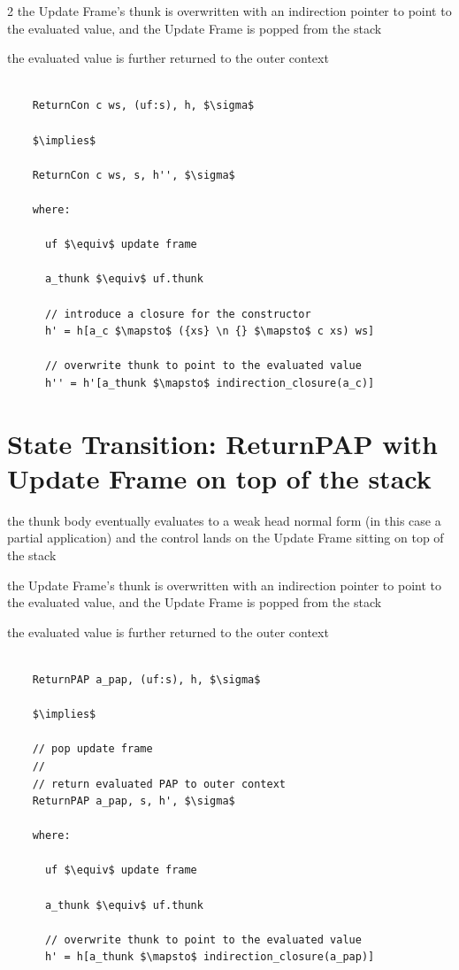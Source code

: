 \documentclass[8pt]{extarticle}
\begin{document}
\begin{multicols*}{2}
  the Update Frame's thunk is overwritten with an indirection pointer to point to the evaluated value, and the Update Frame is popped from the stack

  the evaluated value is further returned to the outer context

  \begin{lstlisting}

    ReturnCon c ws, (uf:s), h, $\sigma$

    $\implies$

    ReturnCon c ws, s, h'', $\sigma$

    where:

      uf $\equiv$ update frame

      a_thunk $\equiv$ uf.thunk

      // introduce a closure for the constructor
      h' = h[a_c $\mapsto$ ({xs} \n {} $\mapsto$ c xs) ws]

      // overwrite thunk to point to the evaluated value
      h'' = h'[a_thunk $\mapsto$ indirection_closure(a_c)]
  \end{lstlisting}

  \section{State Transition: ReturnPAP with Update Frame on top of the stack}

  the thunk body eventually evaluates to a weak head normal form (in this case a partial application) and the control lands on the Update Frame sitting on top of the stack

  the Update Frame's thunk is overwritten with an indirection pointer to point to the evaluated value, and the Update Frame is popped from the stack

  the evaluated value is further returned to the outer context

  \begin{lstlisting}

    ReturnPAP a_pap, (uf:s), h, $\sigma$

    $\implies$

    // pop update frame
    //
    // return evaluated PAP to outer context
    ReturnPAP a_pap, s, h', $\sigma$

    where:

      uf $\equiv$ update frame

      a_thunk $\equiv$ uf.thunk

      // overwrite thunk to point to the evaluated value
      h' = h[a_thunk $\mapsto$ indirection_closure(a_pap)]
  \end{lstlisting}


\end{multicols*}
\end{document}
